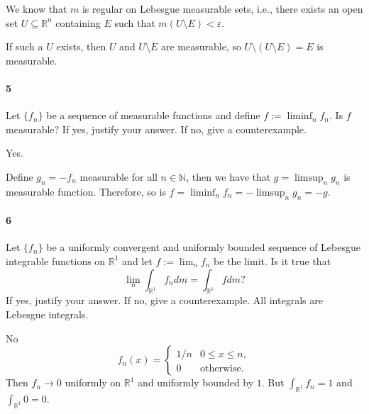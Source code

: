 \documentclass[12pt]{article}
\newenvironment{fullbox}{\begin{lrbox}{\savefullbox}\begin{minipage}{\dimexpr\textwidth-2\fboxsep\relax}}{\end{minipage}\end{lrbox}\begin{center}\framebox[\textwidth]{\usebox{\savefullbox}}\end{center}}
\newenvironment{pbox}[1][]{\begin{fullbox}\ifx#1\empty\else\paragraph{#1}\fi}{\end{fullbox}}
\newcommand{\N}{\mathbb{N}}
\newcommand{\R}{\mathbb{R}}
\newcommand{\eps}{\varepsilon}
\newcommand{\<}{\langle}
\renewcommand{\>}{\rangle}
\begin{document}
We know that $m$ is regular on Lebesgue measurable sets, i.e., there exists an open set $U \subseteq \R^n$ containing $E$ such that $m(U \setminus E) < \eps$.

If such a $U$ exists, then $U$ and $U \setminus E$ are measurable, so $U \setminus (U \setminus E) = E$ is measurable.




\newpage
\begin{pbox}[5]
    Let $\{f_n\}$ be a sequence of measurable functions and define $f:=\liminf_n f_n.$ Is $f$ measurable? If yes, justify your answer. If no, give a counterexample.
\end{pbox}

Yes.

Define $g_n = -f_n$ measurable for all $n \in \N$, then we have that $g = \limsup_n g_n$ is measurable function. Therefore, so is $f = \liminf_n f_n = -\limsup_n g_n = -g$.

\newpage
\begin{pbox}[6]
    Let $\{f_n\}$ be a uniformly convergent and uniformly bounded sequence of Lebesgue integrable functions on $\mathbb R^1$ and let $f:=\lim_n f_n$ be the limit. Is it true that $$\lim_n \int_{\mathbb R^1} f_n dm = \int_{\mathbb R^1} f dm ?$$ If yes, justify your answer. If no, give a counterexample. All integrals are Lebesgue integrals.
\end{pbox}

No
\[
    f_n(x) = \begin{cases}
        1/n & 0 \leq x \leq n, \\
        0 &\text{otherwise}.
    \end{cases}
\]
Then $f_n \to 0$ uniformly on $\R^1$ and uniformly bounded by $1$. But $\int_{\R^1} f_n = 1$ and $\int_{\R^1} 0 = 0$.
\end{document}
